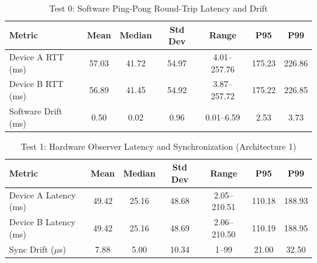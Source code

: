 

\begin{table}[htbp]
\centering
\caption{Test 0: Software Ping-Pong Round-Trip Latency and Drift}
\begin{tabular}{|l|c|c|c|c|c|c|}
\hline
\textbf{Metric} & \textbf{Mean} & \textbf{Median} & \textbf{Std Dev} & \textbf{Range} & \textbf{P95} & \textbf{P99} \\ \hline
Device A RTT (ms) & 57.03 & 41.72 & 54.97 & 4.01--257.76 & 175.23 & 226.86 \\ \hline
Device B RTT (ms) & 56.89 & 41.45 & 54.92 & 3.87--257.72 & 175.22 & 226.85 \\ \hline
Software Drift (ms) & 0.50 & 0.02 & 0.96 & 0.01--6.59 & 2.53 & 3.73 \\ \hline
\end{tabular}
\label{tab:test0_results}
\end{table}


\begin{table}[htbp]
\centering
\caption{Test 1: Hardware Observer Latency and Synchronization (Architecture 1)}
\begin{tabular}{|l|c|c|c|c|c|c|}
\hline
\textbf{Metric} & \textbf{Mean} & \textbf{Median} & \textbf{Std Dev} & \textbf{Range} & \textbf{P95} & \textbf{P99} \\ \hline
Device A Latency (ms) & 49.42 & 25.16 & 48.68 & 2.05--210.51 & 110.18 & 188.93 \\ \hline
Device B Latency (ms) & 49.42 & 25.16 & 48.69 & 2.06--210.50 & 110.19 & 188.95 \\ \hline
Sync Drift ($\mu$s) & 7.88 & 5.00 & 10.34 & 1--99 & 21.00 & 32.50 \\ \hline
\end{tabular}
\label{tab:test1_results}
\end{table}

